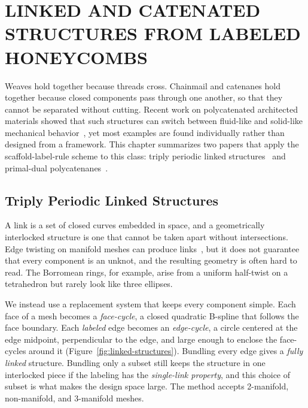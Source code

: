%
%

\chapter{\uppercase{Linked and Catenated Structures from Labeled Honeycombs}}
\label{cha:linked}

Weaves hold together because threads cross. Chainmail and catenanes hold together because closed components pass through one another, so that they cannot be separated without cutting. Recent work on polycatenated architected materials showed that such structures can switch between fluid-like and solid-like mechanical behavior~\cite{zhou20253d}, yet most examples are found individually rather than designed from a framework. This chapter summarizes two papers that apply the scaffold-label-rule scheme to this class: triply periodic linked structures~\cite{yildiz2025linked} and primal-dual polycatenanes~\cite{yildiz2026polycatenane}.

\section{Triply Periodic Linked Structures}
\label{sec:linked}

A link is a set of closed curves embedded in space, and a geometrically interlocked structure is one that cannot be taken apart without intersections. Edge twisting on manifold meshes can produce links~\cite{akleman2015extended,akleman2020topologically}, but it does not guarantee that every component is an unknot, and the resulting geometry is often hard to read. The Borromean rings, for example, arise from a uniform half-twist on a tetrahedron but rarely look like three ellipses.

We instead use a replacement system that keeps every component simple. Each face of a mesh becomes a \emph{face-cycle}, a closed quadratic B-spline that follows the face boundary. Each \emph{labeled} edge becomes an \emph{edge-cycle}, a circle centered at the edge midpoint, perpendicular to the edge, and large enough to enclose the face-cycles around it (Figure~\ref{fig:linked-structures}). Bundling every edge gives a \emph{fully linked} structure. Bundling only a subset still keeps the structure in one interlocked piece if the labeling has the \emph{single-link property}, and this choice of subset is what makes the design space large. The method accepts 2-manifold, non-manifold, and 3-manifold meshes.

